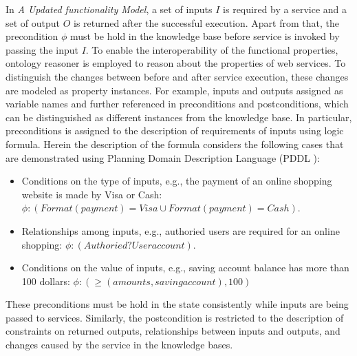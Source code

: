 In \emph{A Updated functionality Model}, a set of inputs $I$ is required by a service and a set of output $O$ is returned after the successful execution. Apart from that, the precondition $\phi$ must be hold in the knowledge base before service is invoked by passing the input $I$. To enable the interoperability of the functional properties, ontology reasoner is employed to reason about the properties of web services. To distinguish the changes between before and after service execution, these changes are modeled as property instances. For example, inputs and outputs assigned as variable names and further referenced in preconditions and postconditions, which can be distinguished as different instances from the knowledge base. In particular, preconditions is assigned to the description of requirements of inputs using logic formula. Herein the description of the formula considers the following cases that are demonstrated using Planning Domain Description Language (PDDL \cite{fox2003pddl2}):
\begin{itemize}
\item Conditions on the type of inputs, e.g., the payment of an online shopping website is made by Visa or Cash: $\phi:(Format(payment)=Visa \cup Format(payment)=Cash)$.
\item Relationships among inputs, e.g.,  authoried users are required for an online shopping: $\phi:(Authoried ? Useraccount)$.
\item Conditions on the value of inputs, e.g., saving account balance has more than 100 dollars: $\phi: (\geq (amounts, saving account), 100)$
\end{itemize}
These preconditions must be hold in the state consistently while inputs are being passed to services. Similarly, the postcondition is restricted to the description of constraints on returned outputs, relationships between inputs and outputs, and changes caused by the service in the knowledge bases.


